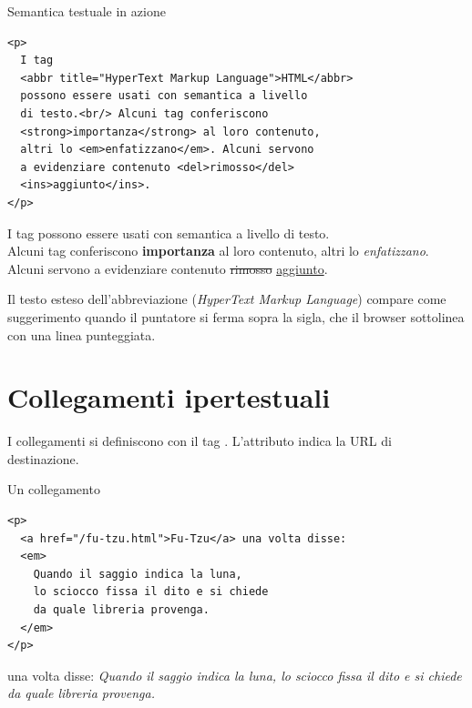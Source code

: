\begin{esempio}{Semantica testuale in azione}
\begin{affianco}[0.55]
\begin{lstlisting}[style=html, name=semantica.html]
<p>
  I tag
  <abbr title="HyperText Markup Language">HTML</abbr>
  possono essere usati con semantica a livello
  di testo.<br/> Alcuni tag conferiscono
  <strong>importanza</strong> al loro contenuto,
  altri lo <em>enfatizzano</em>. Alcuni servono
  a evidenziare contenuto <del>rimosso</del>
  <ins>aggiunto</ins>.
</p>
\end{lstlisting}
\risultato
\begin{browser}
  I tag  possono essere usati con semantica a livello di testo.\\
  Alcuni tag conferiscono \textbf{importanza} al loro contenuto, altri lo
  \textit{enfatizzano}. Alcuni servono a evidenziare contenuto \sout{rimosso}
  \uline{aggiunto}.
\end{browser}
\end{affianco}

Il testo esteso dell'abbreviazione (\textit{HyperText Markup Language}) compare
come suggerimento quando il puntatore si ferma sopra la sigla, che il browser
sottolinea con una linea punteggiata.
\end{esempio}


\section{Collegamenti ipertestuali}

I collegamenti si definiscono con il tag  . L'attributo
 indica la URL di destinazione.

\begin{esempio}{Un collegamento}
\begin{affianco}[0.5]
\begin{lstlisting}[style=html, name=link.html]
<p>
  <a href="/fu-tzu.html">Fu-Tzu</a> una volta disse:
  <em>
    Quando il saggio indica la luna,
    lo sciocco fissa il dito e si chiede
    da quale libreria provenga.
  </em>
</p>
\end{lstlisting}
\risultato
\begin{browser}
   una volta disse: \textit{Quando il saggio
  indica la luna, lo sciocco fissa il dito e si chiede da quale libreria
  provenga.}
\end{browser}
\end{affianco}
\end{esempio}

